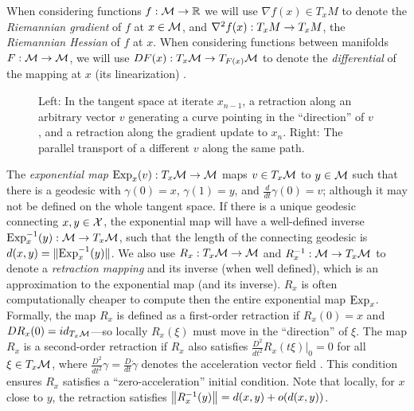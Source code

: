 When considering functions $f : \mathcal{M} \to \mathbb{R}$ we will use $\nabla f(x) \in T_{x} M$ to denote the \emph{Riemannian gradient} of $f$ at $x \in \mathcal{M}$, and $\nabla^2 f(x) : T_{x} M \to T_{x} M$, the \emph{Riemannian Hessian} of $f$ at $x$. When considering functions between manifolds $F : \mathcal{M} \to \mathcal{M}$, we will use $D F(x) : T_{x} \mathcal{M} \to T_{F(x)} \mathcal{M}$ to denote the \emph{differential} of the mapping at $x$ (its linearization) %
\citep[see][for more formal definitions of these objects]{absil2009optimization}.
 \begin{figure}[!t]
 \vspace{-.5cm}
\centering
\begin{minipage}[c]{.48\linewidth}
 \def\svgwidth{2.5in}

   \end{minipage}
   \begin{minipage}[c]{.48\linewidth}
 \def\svgwidth{2.5in}

  \end{minipage}
  \vspace{-1cm}
\caption{Left: In the tangent space at iterate $x_{n-1}$, a retraction along an arbitrary vector $v$ generating a curve pointing in the ``direction'' of  $v$, and a retraction along the gradient update to $x_n$. Right:
The parallel transport of a different $v$ along the same path.}
\label{fig:manifold}
  \vspace{-.5cm}
\end{figure}
The \emph{exponential map} $\Exp_{x}(v) : T_{x} \M \to \M$ maps $v \in T_{x} \mathcal{M}$ to $y \in \mathcal{M}$ such that there is a geodesic with $\gamma(0)=x$, $\gamma(1)=y$, and $\frac{d}{dt}\gamma(0)=v$; although it may not be defined on the whole tangent space. If there is a unique geodesic connecting $x, y \in \mathcal{X}$, the exponential map will have a well-defined inverse $\Exp_{x}^{-1}(y) : \M \to T_{x}\M$, such that the length of the connecting geodesic is $d(x,y)=\Vert \Exp_{x}^{-1}(y) \Vert$. We also use $R_x : T_{x} \mathcal{M} \to \mathcal{M}$ and $R_x^{-1} : \mathcal{M} \to T_{x}\mathcal{M}$ to denote a \emph{retraction mapping} and its inverse (when well defined), which is an approximation to the exponential map (and its inverse). $R_x$ is often computationally cheaper to compute then the entire exponential map $\Exp_x$. Formally, the map $R_x$ is defined as a first-order retraction if $R_x(0) = x$ and $D R_x(0)= id_{T_{x} \mathcal{M}}$---so locally $R_x(\xi)$ must move in the ``direction'' of $\xi$. The map $R_x$ is a second-order retraction if $R_x$ also satisfies $\frac{D^2}{dt^2} R_x(t \xi)|_{0} = 0$ for all $\xi \in T_{x}\mathcal{M}$, where $\frac{D^2}{dt^2}\gamma = \frac{D}{dt} \dot{\gamma}$ denotes the acceleration vector field \citep[][Sec.~5.4]{absil2009optimization}. This condition ensures $R_x$ satisfies a ``zero-acceleration'' initial condition.
Note that locally, for $x$ close to $y$, the retraction satisfies $\norm{R^{-1}_{x}(y)} = d(x, y) + o(d(x, y))$.

